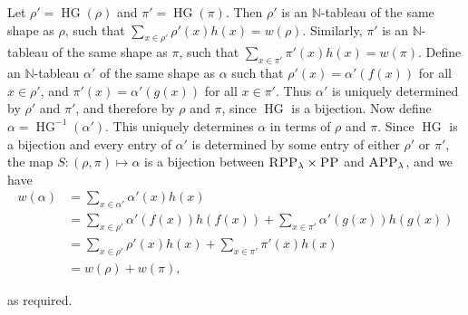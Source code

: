 \begin{Proof}
	Let $\rho' = \operatorname{HG}(\rho)$ and $\pi' = \operatorname{HG}(\pi)$. Then $\rho'$ is an $\mathbb{N}$-tableau of the same shape as $\rho$, such that $\sum_{x \in \rho'} \rho'(x) h(x) = w(\rho)$. Similarly, $\pi'$ is an $\mathbb{N}$-tableau of the same shape as $\pi$, such that $\sum_{x \in \pi'} \pi'(x) h(x) = w(\pi)$. Define an $\mathbb{N}$-tableau $\alpha'$ of the same shape as $\alpha$ such that $\rho'(x) = \alpha'(f(x))$ for all $x \in \rho'$, and $\pi'(x) = \alpha'(g(x))$ for all $x \in \pi'$. Thus $\alpha'$ is uniquely determined by $\rho'$ and $\pi'$, and therefore by $\rho$ and $\pi$, since $\operatorname{HG}$ is a bijection. Now define $\alpha = \operatorname{HG}^{-1}(\alpha')$. This uniquely determines $\alpha$ in terms of $\rho$ and $\pi$. Since $\operatorname{HG}$ is a bijection and every entry of $\alpha'$ is determined by some entry of either $\rho'$ or $\pi'$, the map $S : (\rho, \pi) \longmapsto \alpha$ is a bijection between $\textsc{RPP}_\lambda \times \textsc{PP}$ and $\textsc{APP}_\lambda$, and we have
	\begin{align*}
		w(\alpha) &= \sum_{x \in \alpha'} \alpha'(x) h(x)\\
		&= \sum_{x \in \rho'} \alpha'(f(x)) h(f(x)) + \sum_{x \in \pi'} \alpha'(g(x)) h(g(x))\\
		&= \sum_{x \in \rho'} \rho'(x) h(x) + \sum_{x \in \pi'} \pi'(x) h(x)\\
		&= w(\rho) + w(\pi),
	\end{align*}
	
	as required. \hfill \qedsymbol
	
\end{Proof}



